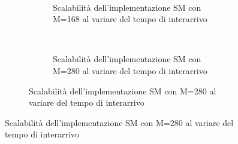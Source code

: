 \begin{figure}[p]
\begin{subfigure}[b]{.5\columnwidth}
    ~
    \begin{subfigure}[b]{\textwidth}
      \centering
      \addtocounter{subfigure}{-1}
      \renewcommand\thesubfigure{\alph{subfigure}2}
      \resizebox{\columnwidth}{!}{}
      \caption{Scalabilit\`a dell'implementazione SM con M=168 al variare del tempo di interarrivo}
      \label{fig:scalability_SM_size168}
    \end{subfigure}
    ~
    \begin{subfigure}[b]{\textwidth}
      \centering
      \addtocounter{subfigure}{-1}
      \renewcommand\thesubfigure{\alph{subfigure}3}
      \resizebox{\columnwidth}{!}{}
      \caption{Scalabilit\`a dell'implementazione SM con M=280 al variare del tempo di interarrivo}
      \label{fig:scalability_SM_size280}
    \end{subfigure}
    \label{fig:allscalability_SM}
  \end{subfigure}
\end{figure}





